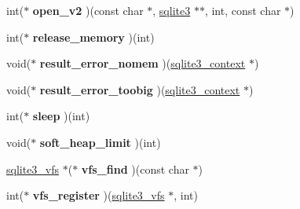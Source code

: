 \begin{DoxyCompactItemize}
\item 
\hypertarget{structsqlite3__api__routines_ac6da992cdbb490e1d1e856a4864851bf}{int($\ast$ {\bfseries open\-\_\-v2} )(const char $\ast$, \hyperlink{structsqlite3}{sqlite3} $\ast$$\ast$, int, const char $\ast$)}\label{structsqlite3__api__routines_ac6da992cdbb490e1d1e856a4864851bf}

\item 
\hypertarget{structsqlite3__api__routines_a2dbb78dde331812425108d9eaeba7bf1}{int($\ast$ {\bfseries release\-\_\-memory} )(int)}\label{structsqlite3__api__routines_a2dbb78dde331812425108d9eaeba7bf1}

\item 
\hypertarget{structsqlite3__api__routines_abaccd85342d77c068d05de2b9cd9c7e0}{void($\ast$ {\bfseries result\-\_\-error\-\_\-nomem} )(\hyperlink{structsqlite3__context}{sqlite3\-\_\-context} $\ast$)}\label{structsqlite3__api__routines_abaccd85342d77c068d05de2b9cd9c7e0}

\item 
\hypertarget{structsqlite3__api__routines_acc888c07a82710c1f0c791ba3058c44c}{void($\ast$ {\bfseries result\-\_\-error\-\_\-toobig} )(\hyperlink{structsqlite3__context}{sqlite3\-\_\-context} $\ast$)}\label{structsqlite3__api__routines_acc888c07a82710c1f0c791ba3058c44c}

\item 
\hypertarget{structsqlite3__api__routines_ae7d2a4258889ab0de44cfce3a9f4b02b}{int($\ast$ {\bfseries sleep} )(int)}\label{structsqlite3__api__routines_ae7d2a4258889ab0de44cfce3a9f4b02b}

\item 
\hypertarget{structsqlite3__api__routines_a217004dbd021cb40d5ad24f963c68451}{void($\ast$ {\bfseries soft\-\_\-heap\-\_\-limit} )(int)}\label{structsqlite3__api__routines_a217004dbd021cb40d5ad24f963c68451}

\item 
\hypertarget{structsqlite3__api__routines_ae08c82348507252bf3775f265caa229e}{\hyperlink{structsqlite3__vfs}{sqlite3\-\_\-vfs} $\ast$($\ast$ {\bfseries vfs\-\_\-find} )(const char $\ast$)}\label{structsqlite3__api__routines_ae08c82348507252bf3775f265caa229e}

\item 
\hypertarget{structsqlite3__api__routines_a0bc5bcc67851f8ceab8114b89f59328d}{int($\ast$ {\bfseries vfs\-\_\-register} )(\hyperlink{structsqlite3__vfs}{sqlite3\-\_\-vfs} $\ast$, int)}\label{structsqlite3__api__routines_a0bc5bcc67851f8ceab8114b89f59328d}


\end{DoxyCompactItemize}
